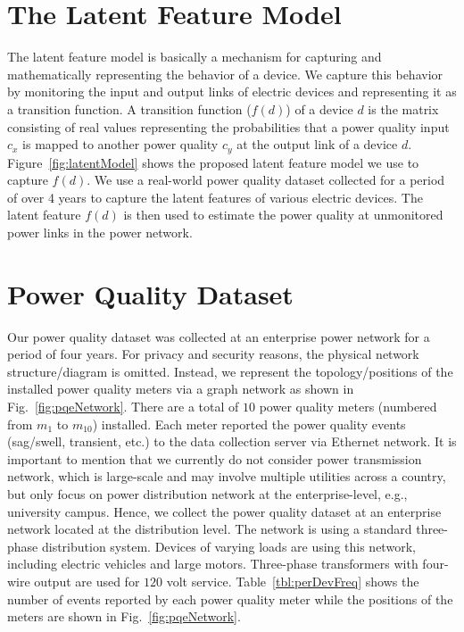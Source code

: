 \vspace{0.5cm}
\section{The Latent Feature Model}
The latent feature model is basically a mechanism for capturing and mathematically representing the behavior of a device. We capture this behavior by monitoring the input and output links of electric devices and representing it as a transition function. A transition function ($f(d)$) of a device $d$ is the matrix consisting of real values representing the probabilities that a power quality input $c_x$ is mapped to another power quality $c_y$ at the output link of a device $d$. Figure~\ref{fig:latentModel} shows the proposed latent feature model we use to capture $f(d)$. We use a real-world power quality dataset collected for a period of over 4 years to capture the latent features of various electric devices. The latent feature $f(d)$ is then used to estimate the power quality at unmonitored power links in the power network.

\vspace{0.5cm}
\section{Power Quality Dataset}
Our power quality dataset was collected at an enterprise power network for a period of four years. For privacy and security reasons, the physical network structure/diagram is omitted. Instead, we represent the topology/positions of the installed power quality meters via a graph network as shown in Fig.~\ref{fig:pqeNetwork}. There are a total of $10$ power quality meters (numbered from $m_1$ to $m_{10}$) installed. Each meter reported the power quality events (sag/swell, transient, etc.) to the data collection server via Ethernet network. It is important to mention that we currently do not consider power transmission network, which is large-scale and may involve multiple utilities across a country, but only focus on power distribution network at the enterprise-level, e.g., university campus. Hence, we collect the power quality dataset at an enterprise network located at the distribution level. The network is using a standard three-phase distribution system. Devices of varying loads are using this network, including electric vehicles and large motors. Three-phase transformers with four-wire output are used for $120$ volt service. Table~\ref{tbl:perDevFreq} shows the number of events reported by each power quality meter while the positions of the meters are shown in Fig.~\ref{fig:pqeNetwork}.

